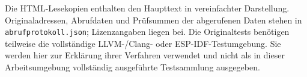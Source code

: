 \documentclass[11pt,a4paper]{article}
\newcommand{\code}[1]{\texttt{#1}}
\begin{document}
Die HTML-Lesekopien enthalten den Haupttext in vereinfachter Darstellung. Originaladressen, Abrufdaten und Prüfsummen der abgerufenen Daten stehen in \code{abrufprotokoll.json}; Lizenzangaben liegen bei. Die Originaltests benötigen teilweise die vollständige LLVM-/Clang- oder ESP-IDF-Testumgebung. Sie werden hier zur Erklärung ihrer Verfahren verwendet und nicht als in dieser Arbeitsumgebung vollständig ausgeführte Testsammlung ausgegeben.

\clearpage{}
{\raggedright}
\end{document}
